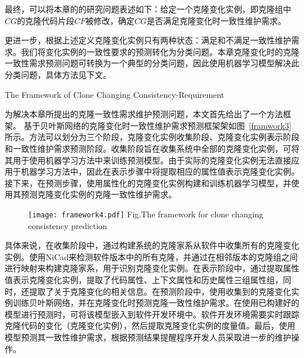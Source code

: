 
最终，可以将本章的的研究问题表述如下：给定一个克隆变化实例，即克隆组中$CG$的克隆代码片段$CF$被修改，确定$CG $是否满足克隆变化时一致性维护需求。

更进一步，根据上述定义克隆变化实例只有两种状态：满足和不满足一致性维护需求。我们将变化实例的一致性要求的预测转化为分类问题。本章克隆变化时的克隆一致性需求预测问题可转换为一个典型的分类问题，因此使用机器学习模型解决此分类问题，具体方法见下文。

{The Framework of Clone Changing Consistency-Requirement}

为解决本章所提出的克隆一致性需求维护预测问题，本文首先给出了一个方法框架。
基于贝叶斯网络的克隆变化时一致性维护需求预测框架架如图~\ref{framwork3}所示。方法可以划分为三个阶段，克隆变化实例收集阶段、克隆变化实例表示阶段和一致性维护需求预测阶段。收集阶段旨在收集系统中全部的克隆变化实例，可将其用于使用机器学习方法中来训练预测模型。由于实际的克隆变化实例无法直接应用于机器学习方法中，因此在表示步骤中将提取相应的属性值表示克隆变化实例。接下来，在预测步骤，使用属性化的克隆变化实例构建和训练机器学习模型，并使用其预测克隆变化实例的克隆一致性维护需求。

\begin{figure}[htbp]
\centering
\texttt{[image: framework4.pdf]}
{Fig.$\!$}{The framework for clone changing consistency prediction}
\vspace{-1em}
\end{figure}

具体来说，在收集阶段中，通过构建系统的克隆家系从软件中收集所有的克隆变化实例。使用NiCad来检测软件版本中的所有克隆，并通过在相邻版本的克隆组之间进行映射来构建克隆家系，用于识别克隆变化实例。在表示阶段中，通过提取属性值表示克隆变化实例，提取了代码属性、上下文属性和历史属性三组属性组，同时，还提取了关于克隆变化的相关信息。在预测阶段中，使用收集到的克隆变化实例训练贝叶斯网络，并在克隆变化时预测克隆一致性维护需求。在使用已构建好的模型进行预测时，可将该模型嵌入到软件开发环境中。软件开发环境需要实时跟踪克隆代码的变化（克隆变化实例），然后提取克隆变化实例的度量值。最后，使用模型预测其一致性维护需求，根据预测结果提醒程序开发人员采取进一步的维护操作。

